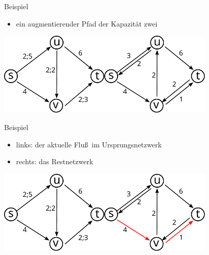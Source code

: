 \documentclass[aspectratio=1610, 11pt]{beamer}
\begin{document}
\begin{frame}
\begin{overprint}
\begin{exampleblock}{Beispiel}
			\begin{itemize}
				\item ein augmentierender Pfad der Kapazit\"at zwei
			\end{itemize}
		\end{exampleblock}
		\includegraphics[height=40mm]{./images/flow7.pdf}\hfill\includegraphics[height=40mm]{./images/flow6.pdf}
\begin{exampleblock}{Beispiel}
			\begin{itemize}
				\item links: der aktuelle Flu\ss\ im Ursprungsnetzwerk
				\item rechts: das Restnetzwerk
			\end{itemize}
		\end{exampleblock}
		\includegraphics[height=40mm]{./images/flow7.pdf}\hfill\includegraphics[height=40mm]{./images/flow8.pdf}

\end{overprint}
\end{frame}
\end{document}
